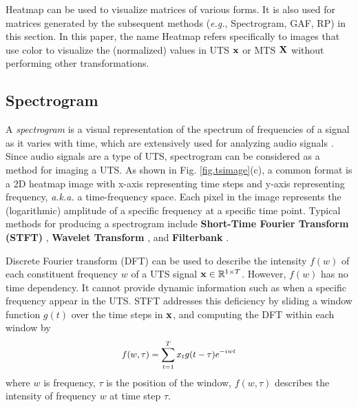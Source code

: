 \vspace{0.2cm}

 Heatmap can be used to visualize matrices of various forms. It is also used for matrices generated by the subsequent methods ({\em e.g.}, Spectrogram, GAF, RP) in this section. In this paper, the name Heatmap refers specifically to images that use color to visualize the (normalized) values in UTS ${\bf x}$ or MTS ${\bf X}$ without performing other transformations.



\subsection{Spectrogram}\label{sec.spectrogram}

A {\em spectrogram} is a visual representation of the spectrum of frequencies of a signal as it varies with time, which are extensively used for analyzing audio signals \cite{gong2021ast}. Since audio signals are a type of UTS, spectrogram can be considered as a method for imaging a UTS. As shown in Fig. \ref{fig.tsimage}(c), a common format is a 2D heatmap image with x-axis representing time steps and y-axis representing frequency, {\em a.k.a.} a time-frequency space. %
Each pixel in the image represents the (logarithmic) amplitude of a specific frequency at a specific time point. Typical methods for %
producing a spectrogram include {\bf Short-Time Fourier Transform (STFT)} \cite{griffin1984signal}, {\bf Wavelet Transform} \cite{daubechies1990wavelet}, and {\bf Filterbank} \cite{vetterli1992wavelets}.

\vspace{0.2cm}

Discrete Fourier transform (DFT) can be used to describe the intensity $f(w)$ of each constituent frequency $w$ of a UTS signal ${\bf x}\in\mathbb{R}^{1\times T}$. However, $f(w)$ has no time dependency. It cannot provide dynamic information such as when a specific frequency appear in the UTS. STFT addresses this deficiency by sliding a window function $g(t)$ over the time steps in %
${\bf x}$, and computing the DFT within each window by
\begin{equation}\label{eq.stft}
\small
\begin{aligned}
f(w,\tau) = \sum_{t=1}^{T}x_{t}g(t - \tau)e^{-iwt}
\end{aligned}
\end{equation}
where $w$ is frequency, $\tau$ is the position of the window, $f(w,\tau)$ describes the intensity of frequency $w$ at time step $\tau$.

